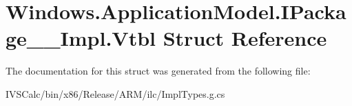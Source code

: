 \hypertarget{struct_windows_1_1_application_model_1_1_i_package_____impl_1_1_vtbl}{}\section{Windows.\+Application\+Model.\+I\+Package\+\_\+\+\_\+\+Impl.\+Vtbl Struct Reference}
\label{struct_windows_1_1_application_model_1_1_i_package_____impl_1_1_vtbl}


The documentation for this struct was generated from the following file\+:\begin{DoxyCompactItemize}
\item 
I\+V\+S\+Calc/bin/x86/\+Release/\+A\+R\+M/ilc/Impl\+Types.\+g.\+cs\end{DoxyCompactItemize}
